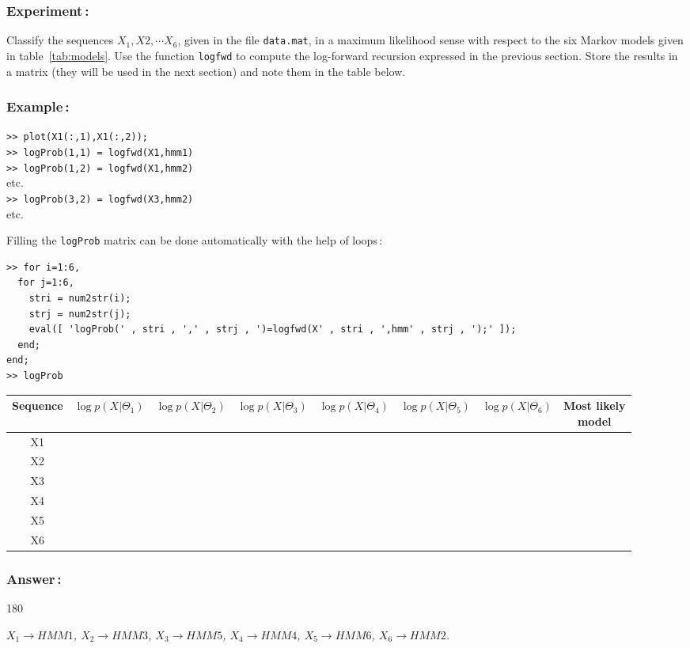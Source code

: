 \documentclass[twoside,a4paper,titlepage]{article}
\newcommand{\mat}[1]{{\tt >> #1} \\}
\newcommand{\com}[1]{{\tt #1}}
\newcommand{\expl}[1]{%
\begin{turn}{180}%
\parbox{\textwidth}{\em #1}%
\end{turn}%
}
\begin{document}
\subsubsection*{Experiment\,:}
Classify the sequences $X_1, X2, \cdots X_6$, given in the file
\com{data.mat}, in a maximum likelihood sense with respect to the six
Markov models given in table~\ref{tab:models}. Use the function
\com{logfwd} to compute the log-forward recursion expressed in the previous
section. Store the results in a matrix (they will be used in the next
section) and note them in the table below.

\subsubsection*{Example\,:}
\mat{plot(X1(:,1),X1(:,2));}
\mat{logProb(1,1) = logfwd(X1,hmm1)}
\mat{logProb(1,2) = logfwd(X1,hmm2)}
etc. \\
\mat{logProb(3,2) = logfwd(X3,hmm2)}
etc.

\medskip
\noindent Filling the \com{logProb} matrix can be done automatically with
the help of loops\,:
\begin{verbatim}
>> for i=1:6,
  for j=1:6,
    stri = num2str(i);
    strj = num2str(j);
    eval([ 'logProb(' , stri , ',' , strj , ')=logfwd(X' , stri , ',hmm' , strj , ');' ]); 
  end;
end;
>> logProb
\end{verbatim}

\noindent
\begin{center}
\renewcommand{\arraystretch}{1.5}
\begin{tabular}{|c|c|c|c|c|c|c|c|} \hline
 Sequence &
\small $\log p(X|\Theta_1)$ & \small $\log p(X|\Theta_2)$ &
\small $\log p(X|\Theta_3)$ & \small $\log p(X|\Theta_4)$ &
\small $\log p(X|\Theta_5)$ & \small $\log p(X|\Theta_6)$ &
\parbox[c][3em][c]{11ex}{Most likely\\ model} \\ \hline
X1 & & & & & & & \\ \hline
X2 & & & & & & & \\ \hline
X3 & & & & & & & \\ \hline
X4 & & & & & & & \\ \hline
X5 & & & & & & & \\ \hline
X6 & & & & & & & \\ \hline
\end{tabular}
\end{center}

\subsubsection*{Answer\,:}
\expl{$X_1 \rightarrow HMM1$, $X_2 \rightarrow HMM3$, $X_3 \rightarrow
HMM5$, $X_4 \rightarrow HMM4$, $X_5 \rightarrow HMM6$, $X_6 \rightarrow
HMM2$.}
\end{document}
